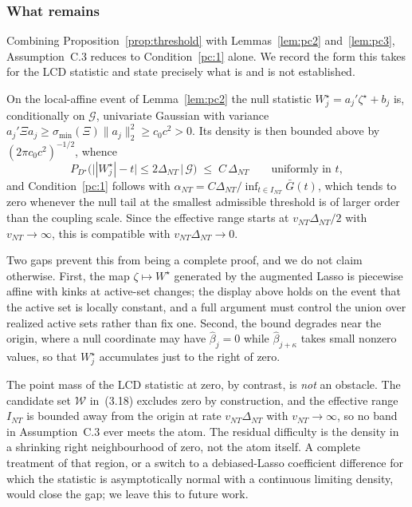 \subsubsection*{What remains}

Combining Proposition~\ref{prop:threshold} with Lemmas~\ref{lem:pc2}
and~\ref{lem:pc3}, Assumption~C.3 reduces to Condition~\ref{pc:1} alone.  We
record the form this takes for the LCD statistic and state precisely what is
and is not established.

\begin{remark}
\label{rmk:density}
On the local-affine event of Lemma~\ref{lem:pc2} the null statistic
$W_j^\star = a_j'\zeta^\star + b_j$ is, conditionally on $\mathcal{G}$,
univariate Gaussian with variance $a_j'\Xi a_j \ge \sigma_{\min}(\Xi)\|a_j\|_2^2
\ge c_0 c^2 > 0$.  Its density is then bounded above by
$(2\pi c_0 c^2)^{-1/2}$, whence
\[
P_{D^\star}\bigl( \bigl||W_j^\star| - t\bigr| \le 2\Delta_{NT} \,\big|\,
\mathcal{G} \bigr) \;\le\; C\,\Delta_{NT}
\qquad \text{uniformly in } t,
\]
and Condition~\ref{pc:1} follows with
$\alpha_{NT} = C \Delta_{NT} / \inf_{t \in I_{NT}} \bar G(t)$, which tends to
zero whenever the null tail at the smallest admissible threshold is of larger
order than the coupling scale.  Since the effective range starts at
$v_{NT}\Delta_{NT}/2$ with $v_{NT}\to\infty$, this is compatible with
$v_{NT}\Delta_{NT}\to 0$.

Two gaps prevent this from being a complete proof, and we do not claim
otherwise.  First, the map $\zeta \mapsto W^\star$ generated by the augmented
Lasso is piecewise affine with kinks at active-set changes; the display above
holds on the event that the active set is locally constant, and a full argument
must control the union over realized active sets rather than fix one.  Second,
the bound degrades near the origin, where a null coordinate may have
$\widehat\beta_j = 0$ while $\widehat\beta_{j+\kappa}$ takes small nonzero
values, so that $W_j^\star$ accumulates just to the right of zero.

The point mass of the LCD statistic at zero, by contrast, is \emph{not} an
obstacle.  The candidate set $\mathcal{W}$ in~(3.18) excludes zero by
construction, and the effective range $I_{NT}$ is bounded away from the origin
at rate $v_{NT}\Delta_{NT}$ with $v_{NT}\to\infty$, so no band in
Assumption~C.3 ever meets the atom.  The residual difficulty is the density in
a shrinking right neighbourhood of zero, not the atom itself.  A complete
treatment of that region, or a switch to a debiased-Lasso coefficient
difference for which the statistic is asymptotically normal with a continuous
limiting density, would close the gap; we leave this to future work.
\end{remark}


